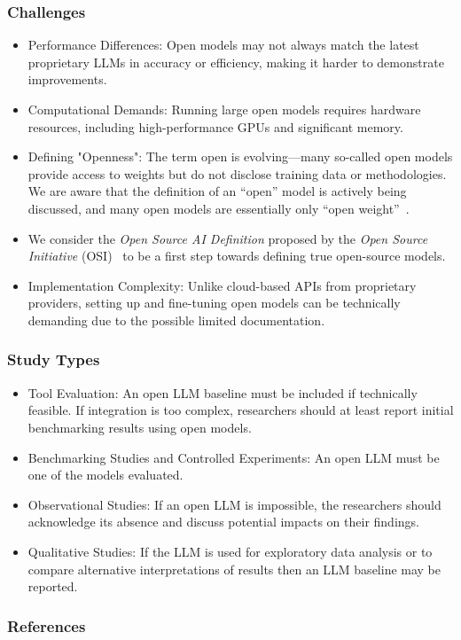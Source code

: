 \documentclass[11pt]{article}
\begin{document}
\subsubsection{Challenges}
\begin{itemize}
    \item Performance Differences: Open models may not always match the latest proprietary LLMs in accuracy or efficiency, making it harder to demonstrate improvements.
    \item Computational Demands: Running large open models requires hardware resources, including high-performance GPUs and significant memory.
    \item Defining "Openness": The term open is evolving—many so-called open models provide access to weights but do not disclose training data or methodologies. We are aware that the definition of an ``open'' model is actively being discussed, and many open models are essentially only ``open weight''~\cite{Gibney2024}.
    \item We consider the \emph{Open Source AI Definition} proposed by the \emph{Open Source Initiative} (OSI)~\cite{OSIAI2024} to be a first step towards defining true open-source models.
    \item Implementation Complexity: Unlike cloud-based APIs from proprietary providers, setting up and fine-tuning open models can be technically demanding due to the possible limited documentation.
\end{itemize}

\subsubsection{Study Types}
\begin{itemize}
    \item Tool Evaluation: An open LLM baseline must be included if technically feasible. If integration is too complex, researchers should at least report initial benchmarking results using open models.
    \item Benchmarking Studies and Controlled Experiments: An open LLM must be one of the models evaluated.
    \item Observational Studies: If an open LLM is impossible, the researchers should acknowledge its absence and discuss potential impacts on their findings.
    \item Qualitative Studies: If the LLM is used for exploratory data analysis or to compare alternative interpretations of results then an LLM baseline may be reported.
\end{itemize}

\subsubsection{References}



\end{document}
